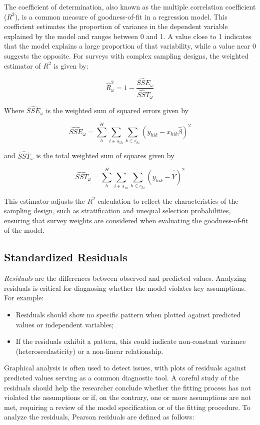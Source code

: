 \documentclass[
  12pt,
]{book}
\begin{document}
The coefficient of determination, also known as the multiple correlation coefficient (\(R^{2}\)), is a common measure of goodness-of-fit in a regression model. This coefficient estimates the proportion of variance in the dependent variable explained by the model and ranges between 0 and 1. A value close to 1 indicates that the model explains a large proportion of that variability, while a value near 0 suggests the opposite. For surveys with complex sampling designs, the weighted estimator of \(R^{2}\) is given by:

\[
\widehat{R}_{\omega}^{2} = 1 - \frac{\widehat{SSE}_{\omega}} {\widehat{SST}_{\omega}}
\]

Where \(\widehat{SSE}_{\omega}\) is the weighted sum of squared errors given by

\[
\widehat{SSE}_{\omega} = \sum_{h}^{H} \sum_{i \in s_{1h}} \sum_{k \in s_{hi}} \left(y_{hik} - x_{hik} \widehat{\beta}\right)^{2}
\]

and \(\widehat{SST}_{\omega}\) is the total weighted sum of squares given by

\[
\widehat{SST}_{\omega} = \sum_{h}^{H} \sum_{i \in s_{1h}} \sum_{k \in s_{hi}} \left(y_{hik} - \widehat{\overline Y} \right)^{2}
\]

This estimator adjusts the \(R^{2}\) calculation to reflect the characteristics of the sampling design, such as stratification and unequal selection probabilities, ensuring that survey weights are considered when evaluating the goodness-of-fit of the model.

\hypertarget{standardized-residuals}{%
\subsection{Standardized Residuals}\label{standardized-residuals}}

\emph{Residuals} are the differences between observed and predicted values. Analyzing residuals is critical for diagnosing whether the model violates key assumptions. For example:

\begin{itemize}
\item
  Residuals should show no specific pattern when plotted against predicted values or independent variables;
\item
  If the residuals exhibit a pattern, this could indicate non-constant variance (heteroscedasticity) or a non-linear relationship.
\end{itemize}

Graphical analysis is often used to detect issues, with plots of residuals against predicted values serving as a common diagnostic tool. A careful study of the residuals should help the researcher conclude whether the fitting process has not violated the assumptions or if, on the contrary, one or more assumptions are not met, requiring a review of the model specification or of the fitting procedure. To analyze the residuals, Pearson residuals \citep{Heeringa_West_Berglund_2017} are defined as follows:
\end{document}
